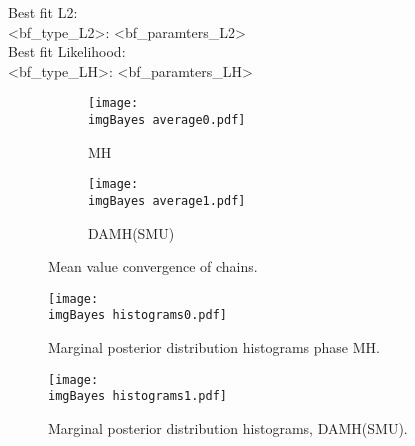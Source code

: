 \documentclass{article}
\newcommand{\imgBayes}{saved_samples/config_mcmc_bayes/img_Bayes/}
\begin{document}
Best fit L2:\\
<bf_type_L2>: <bf_paramters_L2>\\

Best fit Likelihood:\\
<bf_type_LH>: <bf_paramters_LH>\\

\cleardoublepage
\begin{figure}[htb!]
    \centering
    \begin{subfigure}[t]{\textwidth}
      \texttt{[image: \\imgBayes average0.pdf]}
      \caption{MH}
    \end{subfigure}
    \begin{subfigure}[t]{\textwidth}
      \texttt{[image: \\imgBayes average1.pdf]}
      \caption{DAMH(SMU)}
    \end{subfigure}

    \caption{Mean value convergence of chains.}
    \label{fig:average}
\end{figure}


\begin{figure}[htb!]
    \centering
    \texttt{[image: \\imgBayes histograms0.pdf]}
    \caption{Marginal posterior distribution histograms phase MH.}
    \label{fig:posterior_histogram}
\end{figure}

\begin{figure}[htb!]
    \centering
    \texttt{[image: \\imgBayes histograms1.pdf]}
    \caption{Marginal posterior distribution histograms, DAMH(SMU).}
    \label{fig:posterior_histogram}
\end{figure}
\end{document}
